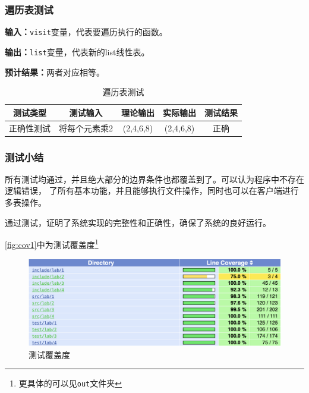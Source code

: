 \subsubsection{遍历表测试}
\textbf{输入：}\texttt{visit}变量，代表要遍历执行的函数。
\par
\textbf{输出：}\texttt{list}变量，代表新的list线性表。
\par
\textbf{预计结果：}两者对应相等。
\begin{table}[h]
    \caption{遍历表测试}
    \centering
    \begin{tabular}{@{}ccccc@{}}
        \toprule
        \multicolumn{1}{c}{测试类型}    & \multicolumn{1}{c}{测试输入} & \multicolumn{1}{c}{理论输出} & \multicolumn{1}{c}{实际输出} &
        \multicolumn{1}{c}{测试结果} \\ \midrule
        \multicolumn{1}{c|}{正确性测试}  & 将每个元素乘2&(2,4,6,8)&(2,4,6,8)&正确\\ \bottomrule
    \end{tabular}
    \label{tab:traversetest1}
\end{table}

\subsubsection{测试小结}
所有测试均通过，并且绝大部分的边界条件也都覆盖到了。可以认为程序中不存在逻辑错误，
了所有基本功能，并且能够执行文件操作，同时也可以在客户端进行多表操作。
\par
通过测试，证明了系统实现的完整性和正确性，确保了系统的良好运行。
\par
\autoref{fig:cov1}中为测试覆盖度\footnote{更具体的可以见\texttt{out}文件夹}

\begin{figure}
\centering
\caption{测试覆盖度}\label{fig:cov1}
\includegraphics[scale=.5]{cov.png}
\end{figure}

